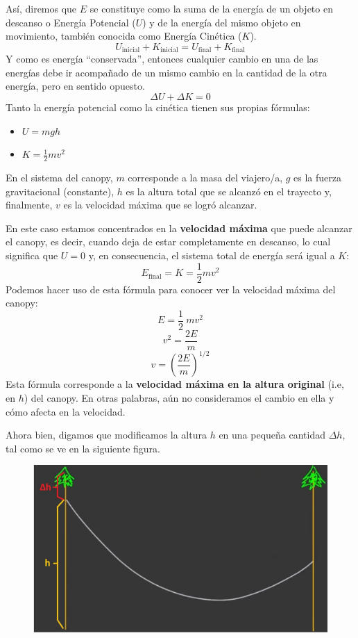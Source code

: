 \documentclass[12pt]{article}
\begin{document}
Así, diremos que $E$ se constituye como la suma de la energía de un objeto en descanso o Energía Potencial ($U$) y de la energía del mismo objeto en movimiento, también conocida como Energía Cinética ($K$).
\[U_{\text{inicial}} + K_{\text{inicial}} = U_{\text{final}} + K_{\text{final}}\]
Y como es energía ``conservada'', entonces cualquier cambio en una de las energías debe ir acompañado de un mismo cambio en la cantidad de la otra energía, pero en sentido opuesto.
\[\Delta U + \Delta K = 0\]
Tanto la energía potencial como la cinética tienen sus propias fórmulas:

\begin{itemize}
\item $U = mgh$
\item $K = \frac{1}{2}mv^{2}$
\end{itemize}

En el sistema del canopy, $m$ corresponde a la masa del viajero/a, $g$ es la fuerza gravitacional (constante), $h$ es la altura total que se alcanzó en el trayecto y, finalmente, $v$ es la velocidad máxima que se logró alcanzar.

En este caso estamos concentrados en la \textbf{velocidad máxima} que puede alcanzar el canopy, es decir, cuando deja de estar completamente en descanso, lo cual significa que $U = 0$ y, en consecuencia, el sistema total de energía será igual a $K$:
\[E_{\text{final}} = K = \frac{1}{2}mv^{2}\]
Podemos hacer uso de esta fórmula para conocer ver la velocidad máxima del canopy:
\[E = \frac{1}{2} \ mv^{2}\]
\[v^{2} = \frac{2E}{m}\]
\[v = \left(\frac{2E}{m}\right)^{1/2}\]
Esta fórmula corresponde a la \textbf{velocidad máxima en la altura original} (i.e, en $h$) del canopy. En otras palabras, aún no consideramos el cambio en ella y cómo afecta en la velocidad. 

Ahora bien, digamos que modificamos la altura $h$ en una pequeña cantidad $\Delta h$, tal como se ve en la siguiente figura.

\begin{figure}[hbt!]
\centering
\includegraphics[scale=0.3]{img/zipline_example_2.jpg}
\end{figure}
\end{document}
